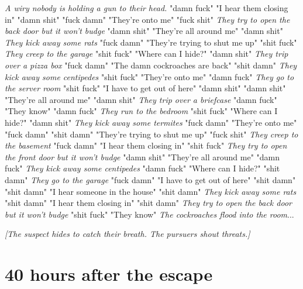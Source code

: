 \documentclass{report}
\begin{document}
\textit{A wiry nobody is holding a gun to their head.} "damn fuck" "I hear them closing in" "damn shit" \textit{} "fuck damn" "They're onto me" "fuck shit" \textit{They try to open the back door but it won't budge} "damn shit" "They're all around me" "damn shit" \textit{They kick away some rats} "fuck damn" "They're trying to shut me up" "shit fuck" \textit{They creep to the garage} "shit fuck" "Where can I hide?" "damn shit" \textit{They trip over a pizza box} "fuck damn" "The damn cockroaches are back" "shit damn" \textit{They kick away some centipedes} "shit fuck" "They're onto me" "damn fuck" \textit{They go to the server room} "shit fuck" "I have to get out of here" "damn shit" \textit{} "damn shit" "They're all around me" "damn shit" \textit{They trip over a briefcase} "damn fuck" "They know" "damn fuck" \textit{They run to the bedroom} "shit fuck" "Where can I hide?" "damn shit" \textit{They kick away some termites} "fuck damn" "They're onto me" "fuck damn" \textit{} "shit damn" "They're trying to shut me up" "fuck shit" \textit{They creep to the basement} "fuck damn" "I hear them closing in" "shit fuck" \textit{They try to open the front door but it won't budge} "damn shit" "They're all around me" "damn fuck" \textit{They kick away some centipedes} "damn fuck" "Where can I hide?" "shit damn" \textit{They go to the garage} "fuck damn" "I have to get out of here" "shit damn" \textit{} "shit damn" "I hear someone in the house" "shit damn" \textit{They kick away some rats} "shit damn" "I hear them closing in" "shit damn" \textit{They try to open the back door but it won't budge} "shit fuck" "They know" \textit{The cockroaches flood into the room}...

\textit{[The suspect hides to catch their breath. The pursuers shout threats.]}


\section*{40 \small{hours after the escape}}
\end{document}
